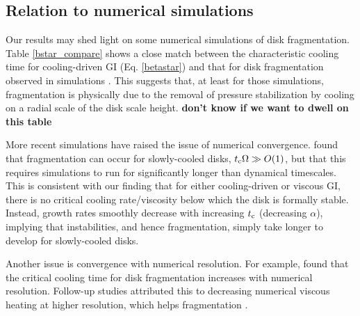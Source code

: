 
\subsection{Relation to numerical simulations}\label{prev_works}
Our results may shed light on some numerical simulations 
of disk fragmentation. Table 
\ref{bstar_compare} shows a close match between the characteristic
cooling time for cooling-driven GI (Eq. \ref{betastar}) 
and that for disk fragmentation observed in simulations 
\citep{gammie01,rice05,rice11}. This suggests that, at least for those
simulations, fragmentation is physically due to the removal of
pressure stabilization by cooling on a radial scale of the disk scale
height. 
{\bf don't know if we want to dwell on this table}

More recent simulations have raised the issue of numerical
convergence. \cite{paardekooper12} found that fragmentation can occur
for   
slowly-cooled disks, $t_\mathrm{c}\Omega\gg O(1)$, but that this requires   
simulations to run for significantly longer than dynamical 
timescales. This is consistent with our finding
that for either cooling-driven or viscous GI, there is no critical 
cooling rate/viscosity below  which the disk is  
formally stable. Instead, growth rates smoothly decrease with
increasing $t_\mathrm{c}$ (decreasing $\alpha$), implying that
instabilities, and hence fragmentation, simply take longer to develop
for slowly-cooled disks.         

Another issue is convergence with numerical resolution. For example,
\cite{meru11} found that the critical cooling time for 
disk fragmentation increases with numerical resolution. %
Follow-up studies attributed this to decreasing numerical viscous
heating at higher resolution, which helps fragmentation
\citep{lodato11,meru12}. %

